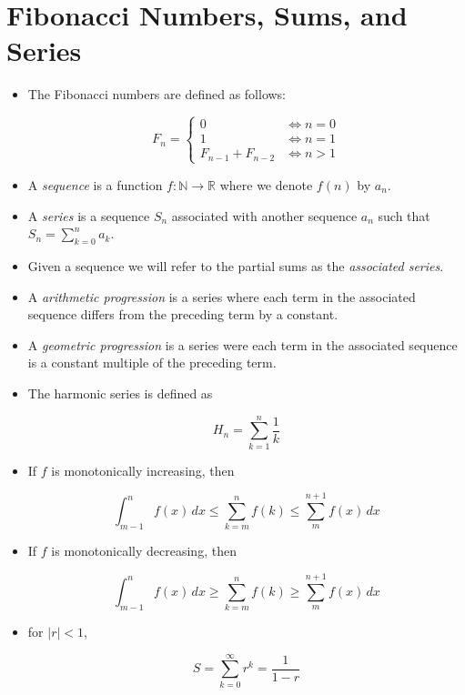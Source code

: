 \documentclass[12pt]{scrartcl}
\begin{document}
\section{Fibonacci Numbers, Sums, and Series}
\begin{itemize}
    \item The Fibonacci numbers are defined as follows:

        \begin{equation*}
            F_n = \begin{cases}
                0 & \Leftrightarrow n = 0 \\
                1 & \Leftrightarrow n = 1 \\
                F_{n-1} + F_{n - 2} & \Leftrightarrow n > 1
            \end{cases}
        \end{equation*}

    \item A \textit{sequence} is a function $f: \mathbb{N} \rightarrow \mathbb{R}$ where we denote $f(n)$ by $a_n$.
    \item A \textit{series} is a sequence $S_n$ associated with another sequence $a_n$ such that $S_n = \sum _{k = 0} ^n a_k$.
    \item Given a sequence we will refer to the partial sums as the \textit{associated series}.
    \item A \textit{arithmetic progression} is a series where each term in the associated sequence differs from the preceding term by a constant.
    \item A \textit{geometric progression} is a series were each term in the associated sequence is a constant multiple of the preceding term.
    \item The harmonic series is defined as

        \begin{equation*}
            H_n = \sum _{k = 1} ^n \frac{1}{k}
        \end{equation*}

    \item If $f$ is monotonically increasing, then

        \begin{equation*}
            \int_{m - 1} ^n f(x)\, dx \leq
            \sum_{k = m} ^n f(k) \leq
            \sum_m ^{n + 1} f(x)\, dx
        \end{equation*}


    \item If $f$ is monotonically decreasing, then

        \begin{equation*}
            \int_{m - 1} ^n f(x)\, dx \geq
            \sum_{k = m} ^n f(k) \geq
            \sum_m ^{n + 1} f(x)\, dx
        \end{equation*}

    \item for $|r| < 1$,

        \begin{equation*}
            S = \sum _{k = 0} ^\infty r^k = \frac{1}{1 - r}
        \end{equation*}
\end{itemize}
\end{document}
